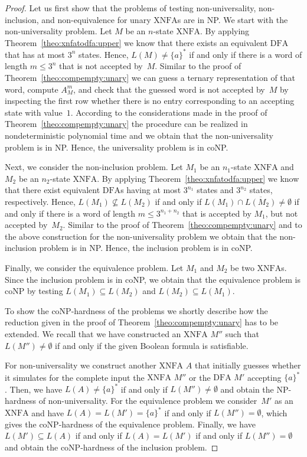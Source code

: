\documentclass[final,copyright,noderivs]{eptcs}
\theoremstyle{plain}
\theoremstyle{definition}
\newcommand{\dfa}{\textrm{DFA}}
\newcommand{\xnfa}{\textrm{XNFA}}
\begin{document}
\begin{proof}
Let us first show that the problems of testing non-universality, 
non-inclusion, and non-equivalence for unary $\xnfa$s are in {\sf NP}.
We start with the non-universality problem. Let $M$ be an $n$-state $\xnfa$.
By applying Theorem~\ref{theo:xnfatodfa:upper} we know that there exists an
equivalent $\dfa$ that has at most $3^n$ states. 
Hence, $L(M) \neq \{a\}^*$ if and only if there is a word of length $m \le 3^n$ that is not accepted by~$M$.
Similar to the proof of Theorem~\ref{theo:compempty:unary} we can guess a ternary representation of that word,
compute $A_M^m$, and check that the guessed word is not accepted by~$M$ by inspecting the first row
whether there is no entry corresponding to an accepting state with value~$1$. According to the
considerations made in the proof of Theorem~\ref{theo:compempty:unary} the procedure can be realized in
nondeterministic polynomial time and we obtain that the non-universality problem is in {\sf NP}. 
Hence, the universality problem is in {\sf coNP}.

Next, we consider the non-inclusion problem. Let $M_1$ be an $n_1$-state $\xnfa$ and $M_2$ be an $n_2$-state $\xnfa$.
By applying Theorem~\ref{theo:xnfatodfa:upper} we know that there exist equivalent $\dfa$s having at most
$3^{n_1}$ states and $3^{n_2}$ states, respectively. 
Hence, $L(M_1) \not\subseteq L(M_2)$ if and only if $L(M_1) \cap \overline{L(M_2)} \neq \emptyset$
if and only if
there is a word of length $m \le 3^{n_1+n_2}$ that is accepted by $M_1$, but not accepted by~$M_2$.
Similar to the proof of Theorem~\ref{theo:compempty:unary} and to the above construction for the non-universality
problem we obtain that the non-inclusion problem is in {\sf NP}. Hence, the inclusion problem is in {\sf coNP}.

Finally, we consider the equivalence problem. Let $M_1$ and $M_2$ be two $\xnfa$s.
Since the inclusion problem is in {\sf coNP}, we obtain that the equivalence problem is {\sf coNP}
by testing $L(M_1) \subseteq L(M_2)$ and $L(M_2) \subseteq L(M_1)$.

To show the \textsf{coNP}-hardness of the problems
we shortly describe how the reduction given in the proof of
Theorem~\ref{theo:compempty:unary} has to be extended.
We recall that we have constructed an $\xnfa$ $M''$
such that $L(M'') \neq \emptyset$ if and only if the given Boolean formula is satisfiable.

For non-universality we construct another $\xnfa$ $A$ 
that initially guesses whether it simulates for the complete 
input the $\xnfa$ $M''$ or the $\dfa$ $M'$ accepting $\{a\}^*$.
Then, we have $L(A) \neq \{a\}^*$ if and only if $L(M'') \neq \emptyset$
and obtain the \textsf{NP}-hardness of non-universality.
For the equivalence problem we consider~$M'$ as an $\xnfa$
and have $L(A)=L(M')=\{a\}^*$ if and only if $L(M'')=\emptyset$,
which gives the \textsf{coNP}-hardness of the equivalence problem.
Finally, we have \mbox{$L(M') \subseteq L(A)$} if and only if 
$L(A)=L(M')$ if and only if $L(M'')=\emptyset$ and obtain
the \textsf{coNP}-hardness of the inclusion problem.
\end{proof}
\end{document}
